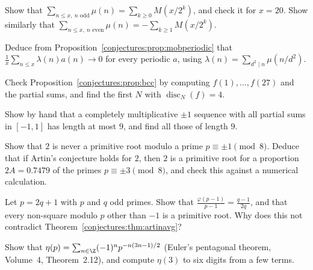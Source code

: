 \begin{exercise}[$\star$]\label{conjectures:ex:oddmobius}
Show that $\sum_{n\le x,\ n\text{ odd}}\mu(n)=\sum_{k\ge0}M(x/2^k)$, and check it for $x=20$. Show similarly that $\sum_{n\le x,\ n\text{ even}}\mu(n)=-\sum_{k\ge1}M(x/2^k)$.
\end{exercise}

\begin{exercise}[$\star\star$]\label{conjectures:ex:liouvilleperiodic}
Deduce from Proposition~\ref{conjectures:prop:mobperiodic} that $\frac1x\sum_{n\le x}\lambda(n)a(n)\to0$ for every periodic $a$, using $\lambda(n)=\sum_{d^2\mid n}\mu(n/d^2)$.
\end{exercise}

\begin{exercise}[$\star$]\label{conjectures:ex:edpcheck}
Check Proposition~\ref{conjectures:prop:bcc} by computing $f(1),\dots,f(27)$ and the partial sums, and find the first $N$ with $\operatorname{disc}_N(f)=4$.
\end{exercise}

\begin{exercise}[$\star\star$]\label{conjectures:ex:multone}
Show by hand that a completely multiplicative $\pm1$ sequence with all partial sums in $[-1,1]$ has length at most $9$, and find all those of length $9$.
\end{exercise}

\begin{exercise}[$\star$]\label{conjectures:ex:artinmod8}
Show that $2$ is never a primitive root modulo a prime $p\equiv\pm1\pmod8$. Deduce that if Artin's conjecture holds for $2$, then $2$ is a primitive root for a
proportion $2A=0.7479$ of the primes $p\equiv\pm3\pmod8$, and check this against a numerical calculation.
\end{exercise}

\begin{exercise}[$\star\star$]\label{conjectures:ex:artinsg}
Let $p=2q+1$ with $p$ and $q$ odd primes. Show that $\frac{\varphi(p-1)}{p-1}=\frac{q-1}{2q}$, and that every non-square modulo $p$ other than $-1$ is a primitive root.
Why does this not contradict Theorem~\ref{conjectures:thm:artinavg}?
\end{exercise}

\begin{exercise}[$\star$]\label{conjectures:ex:etapent}
Show that $\eta(p)=\sum_{n\in\Z}(-1)^np^{-n(3n-1)/2}$ (Euler's pentagonal theorem, Volume~4, Theorem~2.12), and compute $\eta(3)$ to six digits from a few terms.
\end{exercise}

